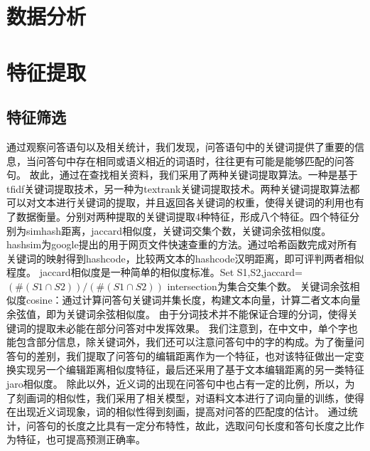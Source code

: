 \documentclass[a4paper,12pt]{report}
\begin{document}
\chapter{数据分析}
\setcounter{page}{1}
\begin{spacing}{1.5}
\songti{}

\section{ }
 
\end{spacing}




\chapter{特征提取}
\begin{spacing}{1.5}
\section{特征筛选}

    通过观察问答语句以及相关统计，我们发现，问答语句中的关键词提供了重要的信息，当问答句中存在相同或语义相近的词语时，往往更有可能是能够匹配的问答句。
	故此，通过在查找相关资料，我们采用了两种关键词提取算法。一种是基于tfidf关键词提取技术，另一种为textrank关键词提取技术。两种关键词提取算法都可以对文本进行关键词的提取，并且返回各关键词的权重，使得关键词的利用也有了数据衡量。分别对两种提取的关键词提取4种特征，形成八个特征。四个特征分别为simhash距离，jaccard相似度，关键词交集个数，关键词余弦相似度。
	hashsim为google提出的用于网页文件快速查重的方法。通过哈希函数完成对所有关键词的映射得到hashcode，比较两文本的hashcode汉明距离，即可评判两者相似程度。
	jaccard相似度是一种简单的相似度标准。Set S1,S2,jaccard=$(\#(S1\cap S2))/(\#(S1\cap S2))$
	intersection为集合交集个数。
	关键词余弦相似度cosine：通过计算问答句关键词并集长度，构建文本向量，计算二者文本向量余弦值，即为关键词余弦相似度。
	由于分词技术并不能保证合理的分词，使得关键词的提取未必能在部分问答对中发挥效果。
	我们注意到，在中文中，单个字也能包含部分信息，除关键词外，我们还可以注意问答句中的字的构成。为了衡量问答句的差别，我们提取了问答句的编辑距离作为一个特征，也对该特征做出一定变换实现另一个编辑距离相似度特征，最后还采用了基于文本编辑距离的另一类特征jaro相似度。
	除此以外，近义词的出现在问答句中也占有一定的比例，所以，为了刻画词的相似性，我们采用了相关模型，对语料文本进行了词向量的训练，使得在出现近义词现象，词的相似性得到刻画，提高对问答的匹配度的估计。
	通过统计，问答句的长度之比具有一定分布特性，故此，选取问句长度和答句长度之比作为特征，也可提高预测正确率。


\end{spacing}
\end{document}
